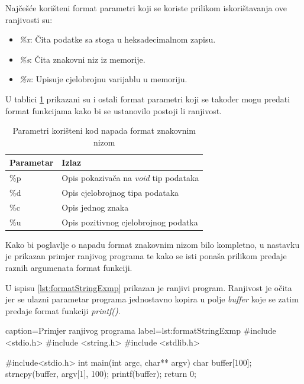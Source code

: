 \documentclass[times, utf8, diplomski, numeric]{fer}
\begin{document}
Najčešće korišteni format parametri koji se koriste prilikom				%
iskorištavanja ove ranjivosti su:

\begin{itemize}
\item \emph{\%x}: Čita podatke sa stoga u heksadecimalnom zapisu.
\item \emph{\%s}: Čita znakovni niz iz memorije.
\item \emph{\%n}: Upisuje cjelobrojnu varijablu u memoriju. 
\end{itemize}

U tablici \ref{tbl:format_parameters} prikazani su i ostali
format parametri koji se također mogu predati format funkcijama
kako bi se ustanovilo postoji li ranjivost.

\begin{table}[htb]
\small
\caption{Parametri korišteni kod napada format znakovnim nizom}
\label{tbl:format_parameters}
\centering
\begin{tabular}{|l|p{8cm}|}
\hline
Parametar & Izlaz \\ \hline
\%p & Opis pokazivača na \emph{void} tip podataka \\ \hline
\%d & Opis cjelobrojnog tipa podataka \\ \hline
\%c & Opis jednog znaka \\ \hline
\%u & Opis pozitivnog cjelobrojnog podatka \\ \hline
\end{tabular}
\end{table}

Kako bi poglavlje o napadu format znakovnim nizom bilo kompletno,
u nastavku je prikazan primjer ranjivog programa te kako se isti
ponaša prilikom predaje raznih argumenata format funkciji.

U ispisu \ref{lst:formatStringExmp} prikazan je ranjivi
program. Ranjivost je očita jer se ulazni parametar programa
jednostavno kopira u polje \emph{buffer} koje se zatim predaje
format funkciji \emph{printf()}. 

\begin{ispis} {caption=Primjer ranjivog programa} {label=lst:formatStringExmp}
#include  <stdio.h>
#include  <string.h>
#include  <stdlib.h>

#include<stdio.h>
int main(int argc, char** argv) {
	char buffer[100];
	strncpy(buffer, argv[1], 100);
	printf(buffer);
	return 0;
}
\end{ispis}
\end{document}
